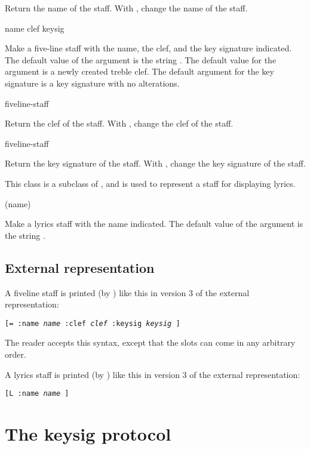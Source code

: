 Return the name of the staff.  With , change the name of
the staff.

 {\key name clef keysig}

Make a five-line staff with the name, the clef, and the key signature
indicated.  The default value of the  argument is the
string .  The default value for the
 argument is a newly created treble clef.  The default
argument for the key signature is a key signature with no
alterations. 

 {fiveline-staff}

Return the clef of the staff.  With , change the clef of
the staff.

 {fiveline-staff}

Return the key signature of the staff.  With , change
the key signature of the staff. 


This class is a subclass of , and is used to represent a
staff for displaying lyrics. 

 (\key name)

Make a lyrics staff with the name indicated.  The default value of the
 argument is the string .

\subsection{External representation}

A fiveline staff is printed (by ) like this in
version 3 of the external representation:

\texttt{[= :name \textit{name} :clef \textit{clef} :keysig \textit{keysig} ]}

The reader accepts this syntax, except that the slots can come in any
arbitrary order. 

A lyrics staff is printed (by ) like this in
version 3 of the external representation:

\texttt{[L :name \textit{name} ]}

\section{The keysig protocol}


